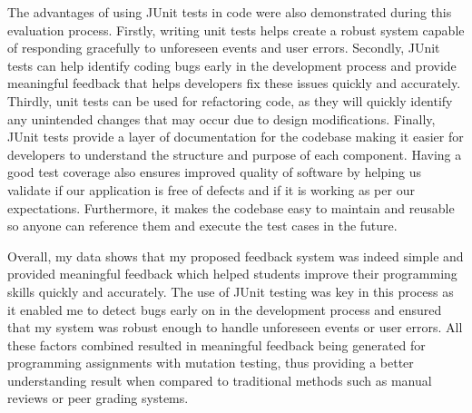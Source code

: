 The advantages of using JUnit tests in code were also demonstrated during this evaluation process. Firstly, writing unit tests helps create a robust system capable of responding gracefully to unforeseen events and user errors. Secondly, JUnit tests can help identify coding bugs early in the development process and provide meaningful feedback that helps developers fix these issues quickly and accurately. Thirdly, unit tests can be used for refactoring code, as they will quickly identify any unintended changes that may occur due to design modifications. Finally, JUnit tests provide a layer of documentation for the codebase making it easier for developers to understand the structure and purpose of each component. 
Having a good test coverage also ensures improved quality of software by helping us validate if our application is free of defects and if it is working as per our expectations. Furthermore, it makes the codebase easy to maintain and reusable so anyone can reference them and execute the test cases in the future. \par

Overall, my data shows that my proposed feedback system was indeed simple and provided meaningful feedback which helped students improve their programming skills quickly and accurately. The use of JUnit testing was key in this process as it enabled me to detect bugs early on in the development process and ensured that my system was robust enough to handle unforeseen events or user errors. All these factors combined resulted in meaningful feedback being generated for programming assignments with mutation testing, thus providing a better understanding result when compared to traditional methods such as manual reviews or peer grading systems. \par


